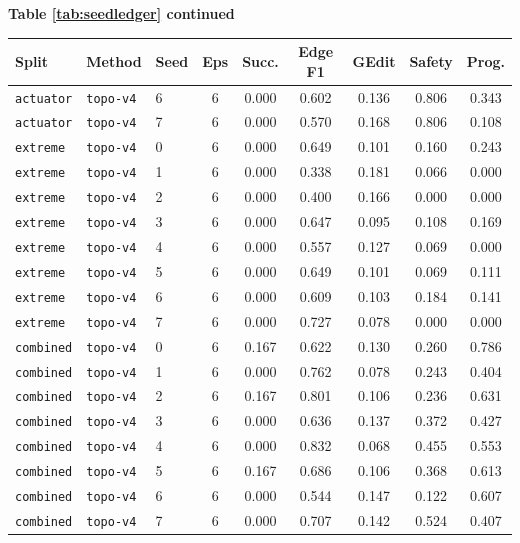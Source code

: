 \documentclass{article}
\begin{document}
\begin{center}
\textbf{Table \ref{tab:seedledger} continued}\\[0.4ex]
\begin{tabular}{lllcccccc}
\toprule
Split & Method & Seed & Eps & Succ. & Edge F1 & GEdit & Safety & Prog. \\
\midrule
\texttt{actuator} & \texttt{topo-v4} & 6 & 6 & 0.000 & 0.602 & 0.136 & 0.806 & 0.343 \\
\texttt{actuator} & \texttt{topo-v4} & 7 & 6 & 0.000 & 0.570 & 0.168 & 0.806 & 0.108 \\
\texttt{extreme} & \texttt{topo-v4} & 0 & 6 & 0.000 & 0.649 & 0.101 & 0.160 & 0.243 \\
\texttt{extreme} & \texttt{topo-v4} & 1 & 6 & 0.000 & 0.338 & 0.181 & 0.066 & 0.000 \\
\texttt{extreme} & \texttt{topo-v4} & 2 & 6 & 0.000 & 0.400 & 0.166 & 0.000 & 0.000 \\
\texttt{extreme} & \texttt{topo-v4} & 3 & 6 & 0.000 & 0.647 & 0.095 & 0.108 & 0.169 \\
\texttt{extreme} & \texttt{topo-v4} & 4 & 6 & 0.000 & 0.557 & 0.127 & 0.069 & 0.000 \\
\texttt{extreme} & \texttt{topo-v4} & 5 & 6 & 0.000 & 0.649 & 0.101 & 0.069 & 0.111 \\
\texttt{extreme} & \texttt{topo-v4} & 6 & 6 & 0.000 & 0.609 & 0.103 & 0.184 & 0.141 \\
\texttt{extreme} & \texttt{topo-v4} & 7 & 6 & 0.000 & 0.727 & 0.078 & 0.000 & 0.000 \\
\texttt{combined} & \texttt{topo-v4} & 0 & 6 & 0.167 & 0.622 & 0.130 & 0.260 & 0.786 \\
\texttt{combined} & \texttt{topo-v4} & 1 & 6 & 0.000 & 0.762 & 0.078 & 0.243 & 0.404 \\
\texttt{combined} & \texttt{topo-v4} & 2 & 6 & 0.167 & 0.801 & 0.106 & 0.236 & 0.631 \\
\texttt{combined} & \texttt{topo-v4} & 3 & 6 & 0.000 & 0.636 & 0.137 & 0.372 & 0.427 \\
\texttt{combined} & \texttt{topo-v4} & 4 & 6 & 0.000 & 0.832 & 0.068 & 0.455 & 0.553 \\
\texttt{combined} & \texttt{topo-v4} & 5 & 6 & 0.167 & 0.686 & 0.106 & 0.368 & 0.613 \\
\texttt{combined} & \texttt{topo-v4} & 6 & 6 & 0.000 & 0.544 & 0.147 & 0.122 & 0.607 \\
\texttt{combined} & \texttt{topo-v4} & 7 & 6 & 0.000 & 0.707 & 0.142 & 0.524 & 0.407 \\

\end{tabular}
\end{center}
\end{document}
